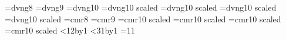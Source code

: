%
%
%
%
%
%
%
%
%
\font\smalldn=dvng8%
\font\ninedn=dvng9%
\font\dvng=dvng10%
\font\halfdn=dvng10 scaled\magstephalf
\font\bigdn=dvng10 scaled
\font\largedn=dvng10 scaled
\font\hugedn=dvng10 scaled
\hyphenchar{}%
\hyphenchar{}%
\hyphenchar{}%
\hyphenchar{}%
\hyphenchar{}%
\hyphenchar{}%
\hyphenchar{}%
\font\smallcr=cmr8%
\font\ninecr=cmr9%
\font\halfcr=cmr10 scaled\magstephalf
\font\bigcr=cmr10 scaled
\font\largecr=cmr10 scaled
\font\hugecr=cmr10 scaled
%
%
%
\let\rsize=\rm
\newcount\chnum
\newdimen\itdim
\newdimen\dnblskip
\newif\ifdnmode
%
%
%
\loop\catcode{}%
\ifnum\chnum<12\advance\chnum by1%
\repeat%
%
\loop\catcode{}%
\ifnum\chnum<31\advance\chnum by1%
\repeat%
=11%
%
\def\subscr#1{\/\itdim=\lastkern
\unkern\kern-\itdim \lower\dp0 \hbox to\itdim{#1\hfil}}
%
%
\def\dnsmall{\let\pdn=\smalldn\let\rsize=\smallcr%
\dnblskip=12pt\ifdnmode\dn\fi}
\def\dnnine{\let\pdn=\ninedn\let\rsize=\ninecr%
\dnblskip=13pt\ifdnmode\dn\fi}
\def\dnnormal{\let\pdn=\dvng\let\rsize=\rm%
\dnblskip=15pt\ifdnmode\dn\fi}
\def\dnhalf{\let\pdn=\halfdn\let\rsize=\halfcr%
\dnblskip=16pt\ifdnmode\dn\fi}
\def\dnbig{\let\pdn=\bigdn\let\rsize=\bigcr%
\dnblskip=18pt\ifdnmode\dn\fi}
\def\dnlarge{\let\pdn=\largedn\let\rsize=\largecr%
\dnblskip=22pt\ifdnmode\dn\fi}
\def\dnhuge{\let\pdn=\hugedn\let\rsize=\hugecr%
\dnblskip=26pt\ifdnmode\dn\fi}
%
\def\dn{\dnmodetrue\pdn\baselineskip=\dnblskip%
\def\<{\llap{\char4}}%
\tolerance=10000\pretolerance=10000}

